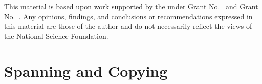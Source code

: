 \documentclass[acmsmall,review,anonymous]{acmart}\settopmatter{printfolios=true,printccs=false,printacmref=false}
\begin{document}
 
\begin{acks}                            This material is based upon work supported by the
   under Grant
  No.~ and Grant
  No.~.  Any opinions, findings, and
  conclusions or recommendations expressed in this material are those
  of the author and do not necessarily reflect the views of the
  National Science Foundation.
\end{acks}






\appendix

\section{Spanning and Copying}
\label{apx:spanning}
\end{document}
